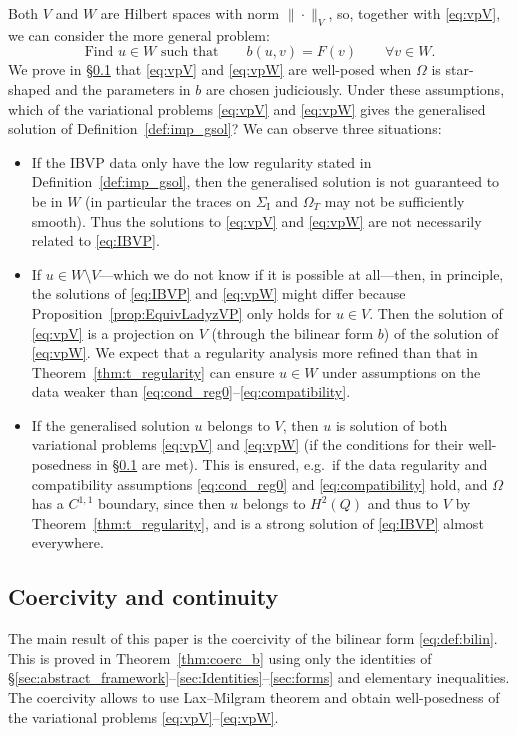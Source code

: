 \documentclass[a4paper]{article}
\theoremstyle{plain}
\theoremstyle{definition}
\newcommand{\SI}{{\Sigma_{\mathrm I}}}
\newcommand{\OT}{{\Omega_T}}
\begin{document}
Both $V$ and $W$ are Hilbert spaces with norm $\|\cdot\|_V$, so, together with \eqref{eq:vpV}, we can consider the more general problem:
\begin{equation}\label{eq:vpW}
	\text{Find $u \in W$ such that}\qquad     b(u,v) = F(v) \qquad \forall v \in W.
\end{equation}
We prove in \S\ref{sec:CC} that \eqref{eq:vpV} and \eqref{eq:vpW} are well-posed when $\Omega$ is star-shaped and the parameters in $b$ are chosen judiciously.
Under these assumptions, which of the variational problems \eqref{eq:vpV} and \eqref{eq:vpW} gives the generalised solution of Definition~\ref{def:imp_gsol}?
We can observe three situations:
\begin{itemize}
\item If the IBVP data only have the low regularity stated in Definition~\ref{def:imp_gsol}, then the generalised solution is not guaranteed to be in $W$ (in particular the traces on $\SI$ and $\OT$ may not be sufficiently smooth).
Thus the solutions to \eqref{eq:vpV} and \eqref{eq:vpW} are not necessarily related to \eqref{eq:IBVP}.

\item If $u\in W\setminus V$---which we do not know if it is possible at all---then, in principle, the solutions of \eqref{eq:IBVP} and \eqref{eq:vpW} might differ because Proposition~\ref{prop:EquivLadyzVP} only holds for $u\in V$.
    Then the solution of \eqref{eq:vpV} is a projection on $V$ (through the bilinear form $b$) of the solution of \eqref{eq:vpW}.
    We expect that a regularity analysis more refined than that in Theorem~\ref{thm:t_regularity} can ensure $u\in W$ under assumptions on the data weaker than \eqref{eq:cond_reg0}--\eqref{eq:compatibility}.

\item If the generalised solution $u$ belongs to $V$, then $u$ is solution of both variational problems \eqref{eq:vpV} and \eqref{eq:vpW} (if the conditions for their well-posedness in \S\ref{sec:CC} are met).
This is ensured, e.g.\ if the data regularity and compatibility assumptions \eqref{eq:cond_reg0} and \eqref{eq:compatibility} hold,
and $\Omega$ has a $C^{1,1}$ boundary, since then $u$ belongs to $H^2(Q)$ and thus to $V$ by Theorem~\ref{thm:t_regularity}, and is a strong solution of \eqref{eq:IBVP} almost everywhere.
\end{itemize}


\subsection{Coercivity and continuity}
\label{sec:CC}
The main result of this paper is the coercivity of the bilinear form \eqref{eq:def:bilin}.
This is proved in Theorem~\ref{thm:coerc_b} using only the identities of \S\ref{sec:abstract_framework}--\ref{sec:Identities}--\ref{sec:forms} and elementary inequalities.
The coercivity allows to use Lax--Milgram theorem and obtain well-posedness of the variational problems \eqref{eq:vpV}--\eqref{eq:vpW}.
\end{document}
